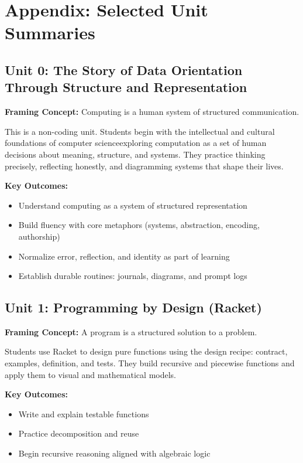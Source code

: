 \documentclass[11pt]{article}
\begin{document}
\newpage

\section*{Appendix: Selected Unit Summaries}

\subsection*{Unit 0: The Story of Data \textemdash Orientation Through Structure and Representation}
\textbf{Framing Concept:} Computing is a human system of structured communication.

This is a non-coding unit. Students begin with the intellectual and cultural foundations of computer science\textemdash exploring computation as a set of human decisions about meaning, structure, and systems. They practice thinking precisely, reflecting honestly, and diagramming systems that shape their lives.

\textbf{Key Outcomes:}
\begin{itemize}[leftmargin=*]
  \item Understand computing as a system of structured representation
  \item Build fluency with core metaphors (systems, abstraction, encoding, authorship)
  \item Normalize error, reflection, and identity as part of learning
  \item Establish durable routines: journals, diagrams, and prompt logs
\end{itemize}

\subsection*{Unit 1: Programming by Design (Racket)}
\textbf{Framing Concept:} A program is a structured solution to a problem.

Students use Racket to design pure functions using the design recipe: contract, examples, definition, and tests. They build recursive and piecewise functions and apply them to visual and mathematical models.

\textbf{Key Outcomes:}
\begin{itemize}[leftmargin=*]
  \item Write and explain testable functions
  \item Practice decomposition and reuse
  \item Begin recursive reasoning aligned with algebraic logic
\end{itemize}
\end{document}
